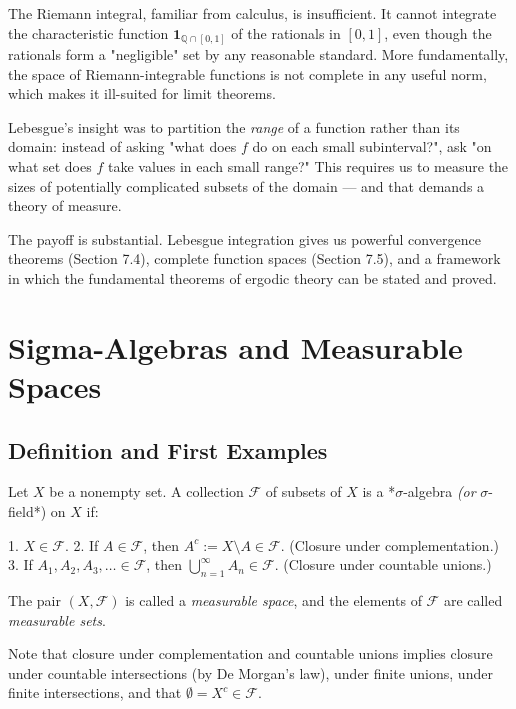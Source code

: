 The Riemann integral, familiar from calculus, is insufficient. It cannot integrate the characteristic function $\mathbf{1}_{\mathbb{Q} \cap [0,1]}$ of the rationals in $[0,1]$, even though the rationals form a "negligible" set by any reasonable standard. More fundamentally, the space of Riemann-integrable functions is not complete in any useful norm, which makes it ill-suited for limit theorems.

Lebesgue's insight was to partition the \textit{range} of a function rather than its domain: instead of asking "what does $f$ do on each small subinterval?", ask "on what set does $f$ take values in each small range?" This requires us to measure the sizes of potentially complicated subsets of the domain --- and that demands a theory of measure.

The payoff is substantial. Lebesgue integration gives us powerful convergence theorems (Section 7.4), complete function spaces (Section 7.5), and a framework in which the fundamental theorems of ergodic theory can be stated and proved.


\bigskip


\section{Sigma-Algebras and Measurable Spaces}\label{sec:7.2}

\subsection{Definition and First Examples}\label{sec:7.2.1}

\begin{definition}\label{def:7.1}
Let $X$ be a nonempty set. A collection $\mathcal{F}$ of subsets of $X$ is a *$\sigma$-algebra\textit{ (or }$\sigma$-field*) on $X$ if:

1. $X \in \mathcal{F}$.
2. If $A \in \mathcal{F}$, then $A^c := X \setminus A \in \mathcal{F}$. (Closure under complementation.)
3. If $A_1, A_2, A_3, \ldots \in \mathcal{F}$, then $\bigcup_{n=1}^{\infty} A_n \in \mathcal{F}$. (Closure under countable unions.)

The pair $(X, \mathcal{F})$ is called a \textit{measurable space}, and the elements of $\mathcal{F}$ are called \textit{measurable sets}.

Note that closure under complementation and countable unions implies closure under countable intersections (by De Morgan's law), under finite unions, under finite intersections, and that $\emptyset = X^c \in \mathcal{F}$.
\end{definition}


